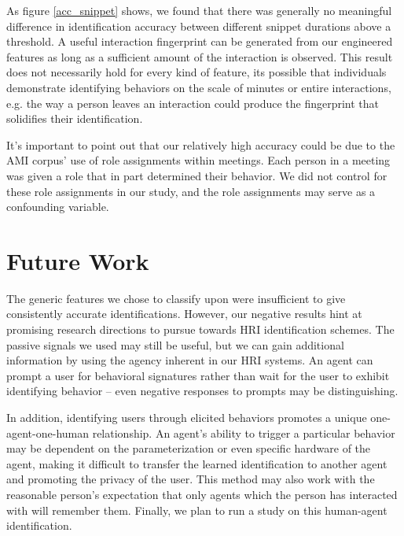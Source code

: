\documentclass[conference]{IEEEtran}
\begin{document}
As figure \ref{acc_snippet} shows, we found that there was generally no meaningful difference in identification accuracy between different snippet durations above a threshold. A useful interaction fingerprint can be generated from our engineered features as long as a sufficient amount of the interaction is observed. This result does not necessarily hold for every kind of feature, its possible that individuals demonstrate identifying behaviors on the scale of minutes or entire interactions, e.g. the way a person leaves an interaction could produce the fingerprint that solidifies their identification. 

It's important to point out that our relatively high accuracy could be due to the AMI corpus' use of role assignments within meetings. Each person in a meeting was given a role that in part determined their behavior. We did not control for these role assignments in our study, and the role assignments may serve as a confounding variable. 

\section{Future Work}

The generic features we chose to classify upon were insufficient to give consistently accurate identifications. However, our negative results hint at promising research directions to pursue towards HRI identification schemes. The passive signals we used may still be useful, but we can gain additional information by using the agency inherent in our HRI systems. An agent can prompt a user for behavioral signatures rather than wait for the user to exhibit identifying behavior -- even negative responses to prompts may be distinguishing. 

In addition, identifying users through elicited behaviors promotes a unique one-agent-one-human relationship. An agent's ability to trigger a particular behavior may be dependent on the parameterization or even specific hardware of the agent, making it difficult to transfer the learned identification to another agent and promoting the privacy of the user. This method may also work with the reasonable person's expectation that only agents which the person has interacted with will remember them. Finally, we plan to run a study on this human-agent identification. 





\end{document}
